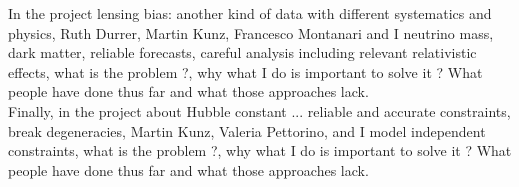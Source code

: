In the project lensing bias: another kind of data with different systematics and physics, Ruth Durrer, Martin Kunz, Francesco Montanari and I neutrino mass, dark matter, reliable forecasts, careful analysis including relevant relativistic effects, what is the problem ?, why what I do is important to solve it ? What people have done thus far and what those approaches lack.  \\

Finally, in the project about Hubble constant ... reliable and accurate constraints, break degeneracies, Martin Kunz, Valeria Pettorino, and I model independent constraints, what is the problem ?, why what I do is important to solve it ? What people have done thus far and what those approaches lack.  \\ 
 